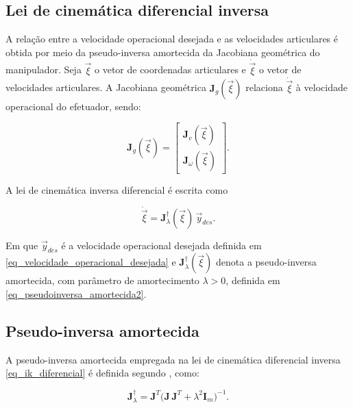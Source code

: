 
\subsection{Lei de cinemática diferencial inversa}

A relação entre a velocidade operacional desejada e as velocidades articulares é obtida por meio da pseudo-inversa amortecida da Jacobiana geométrica do manipulador.
Seja $\vec{\xi}$ o vetor de coordenadas articulares e $\dot{\vec{\xi}}$ o vetor de velocidades articulares.
A Jacobiana geométrica $\mathbf{J}_{g}(\vec{\xi})$ relaciona $\dot{\vec{\xi}}$ à velocidade operacional do efetuador, sendo:

\begin{equation}
\mathbf{J}_{g}(\vec{\xi})
=
\begin{bmatrix}
\mathbf{J}_{v}(\vec{\xi}) \\
\mathbf{J}_{\omega}(\vec{\xi})
\end{bmatrix}.
\label{eq_jacobiana_particionada}
\end{equation}

A lei de cinemática inversa diferencial é escrita como

\begin{equation}
\dot{\vec{\xi}}
=
\mathbf{J}_{\lambda}^{\dagger}(\vec{\xi})\,\vec{y}_{des}.
\label{eq_ik_diferencial}
\end{equation}

Em que $\vec{y}_{des}$ é a velocidade operacional desejada definida em \eqref{eq_velocidade_operacional_desejada} e
$\mathbf{J}_{\lambda}^{\dagger}(\vec{\xi})$ denota a pseudo-inversa amortecida, com parâmetro de amortecimento $\lambda>0$, definida em \eqref{eq_pseudoinversa_amortecida2}.




\subsection{Pseudo-inversa amortecida}

A pseudo-inversa amortecida empregada na lei de cinemática diferencial inversa \eqref{eq_ik_diferencial} é definida segundo \cite{sciavicco_siciliano2010}, como:

\begin{equation}
\label{eq_pseudoinversa_amortecida2}
\mathbf{J}_{\lambda}^{\dagger}
=
\mathbf{J}^{T}
\bigl(
\mathbf{J}\,\mathbf{J}^{T}
+
\lambda^{2}\mathbf{I}_{m}
\bigr)^{-1}.
\end{equation}

